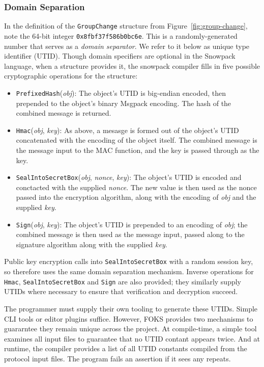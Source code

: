 \subsubsection{Domain Separation}

In the definition of the \texttt{GroupChange} structure from
Figure~\ref{fig:group-change}, note the 64-bit integer
\texttt{0x8fbf37f586b0bc6e}. This is a randomly-generated number that serves as
a \textit{domain separator}. We refer to it below as unique type identifier
(UTID). Though domain specifiers are optional in the Snowpack language, when a
structure provides it, the snowpack compiler fills in five possible
cryptographic operations for the structure:
%
\begin{itemize}

  \item \texttt{PrefixedHash}(\textit{obj}): The object's UTID is big-endian encoded, then
  prepended to the object's binary Msgpack encoding. The hash of the combined message is returned.

  \item \texttt{Hmac}(\textit{obj}, \textit{key}): As above, a mesasge is formed out of the object's UTID
  concatenated with the encoding of the object itself. The combined message is the message input
  to the MAC function, and the key is passed through as the key.

  \item \texttt{SealIntoSecretBox}(\textit{obj}, \textit{nonce}, \textit{key}): The object's UTID is
  encoded and conctacted with the supplied \textit{nonce}. The new value is then used as the nonce
  passed into the encryption algorithm, along with the encoding of \textit{obj} and the supplied \textit{key}.

  \item \texttt{Sign}(\textit{obj}, \textit{key}): The object's UTID is prepended to an encoding
  of \textit{obj}; the combined message is then used as the message input, passed along to the 
  signature algorithm along with the supplied \textit{key}.

\end{itemize}
%
%
Public key encryption calls into \texttt{SealIntoSecretBox} with a random session key, so therefore uses the same
domain separation mechanism. Inverse operations for \texttt{Hmac}, \texttt{SealIntoSecretBox} and \texttt{Sign}
are also provided; they similarly supply UTIDs where necessary to ensure that verification and decryption
succeed.

The programmer must supply their own tooling to generate these UTIDs. Simple CLI tools or 
editor plugins suffice. However, FOKS provides two mechanisms to guararntee they remain unique
across the project. At compile-time, a simple tool examines all input files to guarantee that
no UTID contant appears twice. And at runtime, the compiler provides a list of all UTID constants
compiled from the protocol input files. The program fails an assertion if it sees any repeats.

